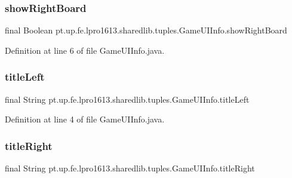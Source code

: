 \subsubsection{\texorpdfstring{show\+Right\+Board}{showRightBoard}}
{\footnotesize\ttfamily final Boolean pt.\+up.\+fe.\+lpro1613.\+sharedlib.\+tuples.\+Game\+U\+I\+Info.\+show\+Right\+Board}



Definition at line 6 of file Game\+U\+I\+Info.\+java.

\hypertarget{classpt_1_1up_1_1fe_1_1lpro1613_1_1sharedlib_1_1tuples_1_1_game_u_i_info_a979f065b051f0c2450588b3d0093112f}{}\label{classpt_1_1up_1_1fe_1_1lpro1613_1_1sharedlib_1_1tuples_1_1_game_u_i_info_a979f065b051f0c2450588b3d0093112f} 
\subsubsection{\texorpdfstring{title\+Left}{titleLeft}}
{\footnotesize\ttfamily final String pt.\+up.\+fe.\+lpro1613.\+sharedlib.\+tuples.\+Game\+U\+I\+Info.\+title\+Left}



Definition at line 4 of file Game\+U\+I\+Info.\+java.

\hypertarget{classpt_1_1up_1_1fe_1_1lpro1613_1_1sharedlib_1_1tuples_1_1_game_u_i_info_af1e57c20040e1ef254be8a9f71a2565e}{}\label{classpt_1_1up_1_1fe_1_1lpro1613_1_1sharedlib_1_1tuples_1_1_game_u_i_info_af1e57c20040e1ef254be8a9f71a2565e} 
\subsubsection{\texorpdfstring{title\+Right}{titleRight}}
{\footnotesize\ttfamily final String pt.\+up.\+fe.\+lpro1613.\+sharedlib.\+tuples.\+Game\+U\+I\+Info.\+title\+Right}



